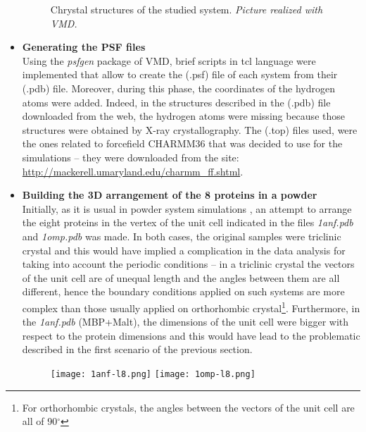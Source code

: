\begin{itemize}
\begin{figure}[h]
\vspace{-0.25cm}
    \footnotesize{\caption{Chrystal structures of the studied system. \textit{Picture realized with VMD.}}
    \label{fig:pdb-structures}
    }
\end{figure}

\item \textbf{Generating the PSF files}\\
Using the \textit{psfgen} package of VMD, brief scripts in tcl language were implemented that allow to create the (.psf) file of each system from their (.pdb) file. Moreover, during this phase, the coordinates of the hydrogen atoms were added. Indeed, in the structures described in the (.pdb) file downloaded from the web, the hydrogen atoms were missing because those structures were obtained by X-ray crystallography. The (.top) files used, were the ones related to forcefield CHARMM36 that was decided to use for the simulations -- they were downloaded from the site: \url{http://mackerell.umaryland.edu/charmm_ff.shtml}. 

\item \textbf{Building the 3D arrangement of the 8 proteins in a powder}\\
Initially, as it is usual in powder system simulations \cite{rahaman2017configurational, fichou2015molecular}, an attempt to arrange the eight proteins in the vertex of the unit cell indicated in the files \textit{1anf.pdb} and \textit{1omp.pdb} was made. In both cases, the original samples were triclinic crystal and this would have implied a complication in the data analysis for taking into account the periodic conditions -- in a triclinic crystal the vectors of the unit cell are of unequal length and the angles between them are all different, hence the boundary conditions applied on such systems are more complex than those usually applied on orthorhombic crystal\footnote{For orthorhombic crystals, the angles between the vectors of the unit cell are all of 90$^\circ$}. Furthermore, in the \textit{1anf.pdb} (MBP+Malt), the dimensions of the unit cell were bigger with respect to the protein dimensions and this would have lead to the problematic described in the first scenario of the previous section.
\begin{figure}[h]
\begin{center}
\begin{minipage}[t]{0.9\textwidth}
\centering
\hfill
\texttt{[image: 1anf-l8.png]}
\hspace{0.65cm}
\texttt{[image: 1omp-l8.png]}
\hfill
\end{minipage} 


\end{center}
\end{figure}
\end{itemize}
